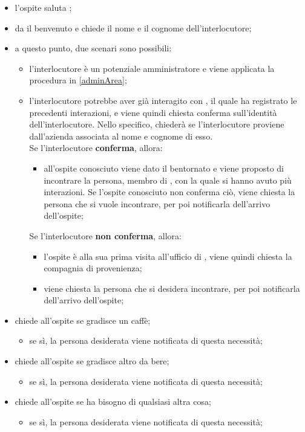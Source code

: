 \begin{itemize}
	\item l'ospite saluta \PROGETTO;
	\item \PROGETTO{} da il benvenuto e chiede il nome e il cognome dell'interlocutore;
	\item a questo punto, due scenari sono possibili:
	\begin{itemize}
		\item l'interlocutore è un potenziale amministratore e viene applicata la procedura in \ref{adminArea};
		\item l'interlocutore potrebbe aver già interagito con \PROGETTO, il quale ha registrato le precedenti interazioni, e viene quindi chiesta conferma sull'identità dell'interlocutore. Nello specifico, \PROGETTO{} chiederà se l'interlocutore proviene dall'azienda associata al nome e cognome di esso. \\
		Se l'interlocutore \textbf{conferma}, allora:
		\begin{itemize}
			\item all'ospite conosciuto viene dato il bentornato e viene proposto di incontrare la persona, membro di \PROPONENTE, con la quale si hanno avuto più interazioni. Se l'ospite conosciuto non conferma ciò, viene chiesta la persona che si vuole incontrare, per poi notificarla dell'arrivo dell'ospite;
		\end{itemize}
		Se l'interlocutore \textbf{non conferma}, allora:
		\begin{itemize}
			\item l'ospite è alla sua prima visita all'ufficio di \PROPONENTE, viene quindi chiesta la compagnia di provenienza;
			\item viene chiesta la persona che si desidera incontrare, per poi notificarla dell'arrivo dell'ospite;
		\end{itemize}
	\end{itemize}
	\item \PROGETTO{} chiede all'ospite se gradisce un caffè;
	\begin{itemize}
		\item se sì, la persona desiderata viene notificata di questa necessità;
	\end{itemize}
	\item \PROGETTO{} chiede all'ospite se gradisce altro da bere;
	\begin{itemize}
		\item se sì, la persona desiderata viene notificata di questa necessità;
	\end{itemize}
	\item \PROGETTO{} chiede all'ospite se ha bisogno di qualsiasi altra cosa;
	\begin{itemize}
		\item se sì, la persona desiderata viene notificata di questa necessità;
	\end{itemize}
\end{itemize}
